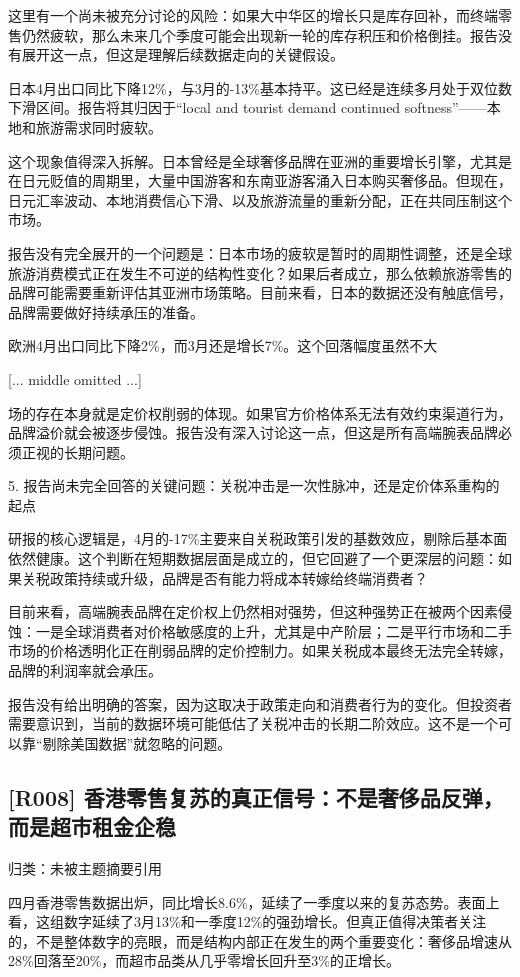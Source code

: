 \documentclass[11pt]{ctexart}
\begin{document}
这里有一个尚未被充分讨论的风险：如果大中华区的增长只是库存回补，而终端零售仍然疲软，那么未来几个季度可能会出现新一轮的库存积压和价格倒挂。报告没有展开这一点，但这是理解后续数据走向的关键假设。

日本4月出口同比下降12\%，与3月的-13\%基本持平。这已经是连续多月处于双位数下滑区间。报告将其归因于“local and tourist demand continued softness”——本地和旅游需求同时疲软。

这个现象值得深入拆解。日本曾经是全球奢侈品牌在亚洲的重要增长引擎，尤其是在日元贬值的周期里，大量中国游客和东南亚游客涌入日本购买奢侈品。但现在，日元汇率波动、本地消费信心下滑、以及旅游流量的重新分配，正在共同压制这个市场。

报告没有完全展开的一个问题是：日本市场的疲软是暂时的周期性调整，还是全球旅游消费模式正在发生不可逆的结构性变化？如果后者成立，那么依赖旅游零售的品牌可能需要重新评估其亚洲市场策略。目前来看，日本的数据还没有触底信号，品牌需要做好持续承压的准备。

欧洲4月出口同比下降2\%，而3月还是增长7\%。这个回落幅度虽然不大

[... middle omitted ...]

场的存在本身就是定价权削弱的体现。如果官方价格体系无法有效约束渠道行为，品牌溢价就会被逐步侵蚀。报告没有深入讨论这一点，但这是所有高端腕表品牌必须正视的长期问题。

5. 报告尚未完全回答的关键问题：关税冲击是一次性脉冲，还是定价体系重构的起点

研报的核心逻辑是，4月的-17\%主要来自关税政策引发的基数效应，剔除后基本面依然健康。这个判断在短期数据层面是成立的，但它回避了一个更深层的问题：如果关税政策持续或升级，品牌是否有能力将成本转嫁给终端消费者？

目前来看，高端腕表品牌在定价权上仍然相对强势，但这种强势正在被两个因素侵蚀：一是全球消费者对价格敏感度的上升，尤其是中产阶层；二是平行市场和二手市场的价格透明化正在削弱品牌的定价控制力。如果关税成本最终无法完全转嫁，品牌的利润率就会承压。

报告没有给出明确的答案，因为这取决于政策走向和消费者行为的变化。但投资者需要意识到，当前的数据环境可能低估了关税冲击的长期二阶效应。这不是一个可以靠“剔除美国数据”就忽略的问题。

\subsection{[R008] 香港零售复苏的真正信号：不是奢侈品反弹，而是超市租金企稳}
{\small\color{refgray}归类：未被主题摘要引用}

四月香港零售数据出炉，同比增长8.6\%，延续了一季度以来的复苏态势。表面上看，这组数字延续了3月13\%和一季度12\%的强劲增长。但真正值得决策者关注的，不是整体数字的亮眼，而是结构内部正在发生的两个重要变化：奢侈品增速从28\%回落至20\%，而超市品类从几乎零增长回升至3\%的正增长。
\end{document}
